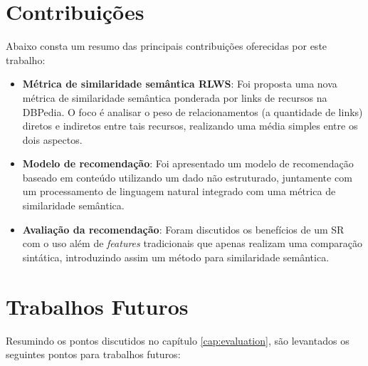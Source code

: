 \section{Contribuições}

Abaixo consta um resumo das principais contribuições oferecidas por este trabalho:

\begin{itemize}
	\item{\textbf{Métrica de similaridade semântica \ac{RLWS}}: Foi proposta uma nova métrica de similaridade semântica ponderada por links de recursos na DBPedia. O foco é analisar o peso de relacionamentos (a quantidade de links) diretos e indiretos entre tais recursos, realizando uma média simples entre os dois aspectos.}
	
	\item{\textbf{Modelo de recomendação}: Foi apresentado um modelo de recomendação baseado em conteúdo utilizando um dado não estruturado, juntamente com um processamento de linguagem natural integrado com uma métrica de similaridade semântica.}
	
	\item{\textbf{Avaliação da recomendação}: Foram discutidos os benefícios de um \ac{SR} com o uso além de \textit{features} tradicionais que apenas realizam uma comparação sintática, introduzindo assim um método para similaridade semântica.}
\end{itemize}

\section{Trabalhos Futuros}

Resumindo os pontos discutidos no capítulo \ref{cap:evaluation}, são levantados os seguintes pontos para trabalhos futuros:

